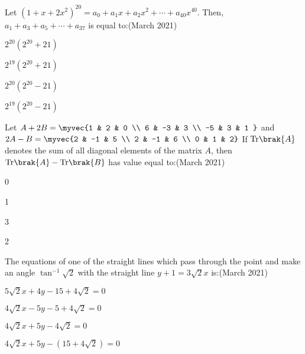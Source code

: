 \item Let $(1 + x + 2x^2)^{20} = a_0 + a_1x + a_2x^2 + \cdots + a_{40}x^{40}$. Then, $a_1 + a_3 + a_5 + \cdots + a_{37}$ is equal to:\hfill (March 2021)

\begin{enumerate}
    \begin{multicols}{2}
    \item $2^{20}(2^{20} + 21)$
    \item $2^{19}(2^{20} + 21)$ 
    \item $2^{20}(2^{20} - 21)$
    \item $2^{19}(2^{20} - 21)$
    \end{multicols}
    
\end{enumerate}
   

\item Let $
A + 2B = \myvec{1 & 2 & 0 \\
6 & -3 & 3 \\
-5 & 3 & 1 }$
 and 
  $2A - B = \myvec{2 & -1 & 5 \\
2 & -1 & 6 \\
0 & 1 & 2}
$ If $\text{Tr}\brak{A}$ denotes the sum of all diagonal elements of the matrix $A$, then $\text{Tr}\brak{A} - \text{Tr}\brak{B}$ has value equal to:\hfill (March 2021)

\begin{enumerate}
  \begin{multicols}{4}
    \item 0
    \item 1
    \item 3
    \item 2
  \end{multicols}
  
\end{enumerate}
\item The equations of one of the straight lines which pass through the point  and make an angle $\tan^{-1} \sqrt{2}$ with the straight line $y + 1 = 3\sqrt{2}x$ is:\hfill (March 2021)

\begin{enumerate}
   \begin{multicols}{2}
    \item $5\sqrt{2}x + 4y - 15 + 4\sqrt{2} = 0$
    \item $4\sqrt{2}x - 5y - 5 + 4\sqrt{2} = 0$
    \item $4\sqrt{2}x + 5y - 4\sqrt{2} = 0$
    \item $4\sqrt{2}x + 5y - (15 + 4\sqrt{2}) = 0$
   \end{multicols}
    
\end{enumerate}

  







